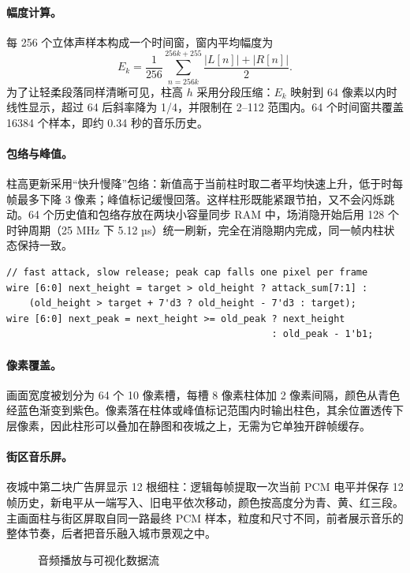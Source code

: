 \paragraph{幅度计算。}每 256 个立体声样本构成一个时间窗，窗内平均幅度为
\begin{equation}
E_k=\frac{1}{256}\sum_{n=256k}^{256k+255}\frac{|L[n]|+|R[n]|}{2}.
\end{equation}
为了让轻柔段落同样清晰可见，柱高 $h$ 采用分段压缩：$E_k$ 映射到 64 像素以内时线性显示，超过 64 后斜率降为 1/4，并限制在 2--112 范围内。64 个时间窗共覆盖 16384 个样本，即约 0.34 秒的音乐历史。

\paragraph{包络与峰值。}柱高更新采用“快升慢降”包络：新值高于当前柱时取二者平均快速上升，低于时每帧最多下降 3 像素；峰值标记缓慢回落。这样柱形既能紧跟节拍，又不会闪烁跳动。64 个历史值和包络存放在两块小容量同步 RAM 中，场消隐开始后用 128 个时钟周期（25 MHz 下 5.12 µs）统一刷新，完全在消隐期内完成，同一帧内柱状态保持一致。

\begin{lstlisting}[style=Verilog]
// fast attack, slow release; peak cap falls one pixel per frame
wire [6:0] next_height = target > old_height ? attack_sum[7:1] :
    (old_height > target + 7'd3 ? old_height - 7'd3 : target);
wire [6:0] next_peak = next_height >= old_peak ? next_height
                                               : old_peak - 1'b1;
\end{lstlisting}

\paragraph{像素覆盖。}画面宽度被划分为 64 个 10 像素槽，每槽 8 像素柱体加 2 像素间隔，颜色从青色经蓝色渐变到紫色。像素落在柱体或峰值标记范围内时输出柱色，其余位置透传下层像素，因此柱形可以叠加在静图和夜城之上，无需为它单独开辟帧缓存。

\paragraph{街区音乐屏。}夜城中第二块广告屏显示 12 根细柱：逻辑每帧提取一次当前 PCM 电平并保存 12 帧历史，新电平从一端写入、旧电平依次移动，颜色按高度分为青、黄、红三段。主画面柱与街区屏取自同一路最终 PCM 样本，粒度和尺寸不同，前者展示音乐的整体节奏，后者把音乐融入城市景观之中。

\begin{figure}[H]\centering
{}
\caption{音频播放与可视化数据流}\label{fig:audio-flow}
\end{figure}


